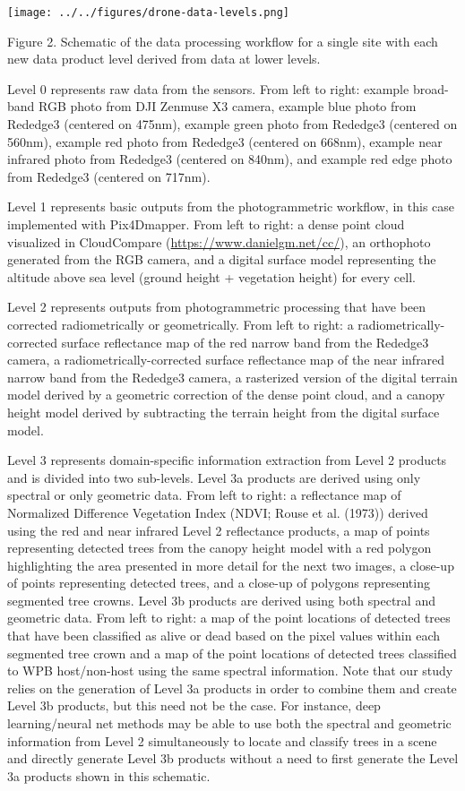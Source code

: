 \documentclass[]{article}
\begin{document}
\texttt{[image: ../../figures/drone-data-levels.png]}

Figure 2. Schematic of the data processing workflow for a single site
with each new data product level derived from data at lower levels.

Level 0 represents raw data from the sensors. From left to right:
example broad-band RGB photo from DJI Zenmuse X3 camera, example blue
photo from Rededge3 (centered on 475nm), example green photo from
Rededge3 (centered on 560nm), example red photo from Rededge3 (centered
on 668nm), example near infrared photo from Rededge3 (centered on
840nm), and example red edge photo from Rededge3 (centered on 717nm).

Level 1 represents basic outputs from the photogrammetric workflow, in
this case implemented with Pix4Dmapper. From left to right: a dense
point cloud visualized in CloudCompare
(\url{https://www.danielgm.net/cc/}), an orthophoto generated from the
RGB camera, and a digital surface model representing the altitude above
sea level (ground height + vegetation height) for every cell.

Level 2 represents outputs from photogrammetric processing that have
been corrected radiometrically or geometrically. From left to right: a
radiometrically-corrected surface reflectance map of the red narrow band
from the Rededge3 camera, a radiometrically-corrected surface
reflectance map of the near infrared narrow band from the Rededge3
camera, a rasterized version of the digital terrain model derived by a
geometric correction of the dense point cloud, and a canopy height model
derived by subtracting the terrain height from the digital surface
model.

Level 3 represents domain-specific information extraction from Level 2
products and is divided into two sub-levels. Level 3a products are
derived using only spectral or only geometric data. From left to right:
a reflectance map of Normalized Difference Vegetation Index (NDVI; Rouse
et al. (1973)) derived using the red and near infrared Level 2
reflectance products, a map of points representing detected trees from
the canopy height model with a red polygon highlighting the area
presented in more detail for the next two images, a close-up of points
representing detected trees, and a close-up of polygons representing
segmented tree crowns. Level 3b products are derived using both spectral
and geometric data. From left to right: a map of the point locations of
detected trees that have been classified as alive or dead based on the
pixel values within each segmented tree crown and a map of the point
locations of detected trees classified to WPB host/non-host using the
same spectral information. Note that our study relies on the generation
of Level 3a products in order to combine them and create Level 3b
products, but this need not be the case. For instance, deep
learning/neural net methods may be able to use both the spectral and
geometric information from Level 2 simultaneously to locate and classify
trees in a scene and directly generate Level 3b products without a need
to first generate the Level 3a products shown in this schematic.
\end{document}
